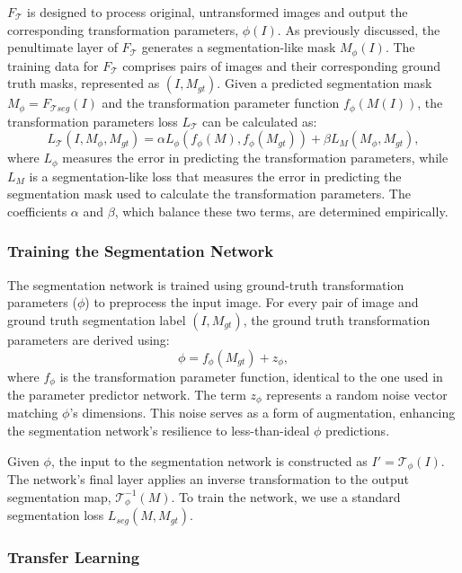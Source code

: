 \(F_{\mathcal{T}}\) is designed to process original, untransformed images and output the corresponding transformation parameters, \( \phi(I) \). As previously discussed, the penultimate layer of \(F_{\mathcal{T}}\) generates a segmentation-like mask \( M_\phi(I) \). The training data for \(F_{\mathcal{T}}\) comprises pairs of images and their corresponding ground truth masks, represented as \((I, M_{gt})\). Given a predicted segmentation mask $M_\phi = F_{\mathcal{T}seg}(I)$ and the transformation parameter function $f_\phi(M(I))$, the transformation parameters loss $L_\mathcal{T}$ can be calculated as:
\begin{equation}
	L_\mathcal{T}(I, M_\phi, M_{gt}) = \alpha L_\phi(f_\phi(M), f_\phi(M_{gt})) + \beta L_{M}(M_\phi, M_{gt}),
\end{equation}
where $L_\phi$ measures the error in predicting the transformation parameters, while $L_{M}$ is a segmentation-like loss that measures the error in predicting the segmentation mask used to calculate the transformation parameters. The coefficients \(\alpha\) and \(\beta\), which balance these two terms, are determined empirically.

\subsubsection{Training the Segmentation Network}

The segmentation network is trained using ground-truth transformation parameters (\(\phi\)) to preprocess the input image. For every pair of image and ground truth segmentation label \((I, M_{gt})\), the ground truth transformation parameters are derived using:
\begin{equation}
	\phi = f_\phi(M_{gt}) + z_\phi,
\end{equation}
where \(f_\phi\) is the transformation parameter function, identical to the one used in the parameter predictor network. The term \(z_\phi\) represents a random noise vector matching \(\phi\)'s dimensions. This noise serves as a form of augmentation, enhancing the segmentation network's resilience to less-than-ideal \(\phi\) predictions.

Given $\phi$, the input to the segmentation network is constructed as $I' = \mathcal{T}_\phi(I)$. The network's final layer applies an inverse transformation to the output segmentation map, \(\mathcal{T}^{-1}_\phi(M)\). To train the network, we use a standard segmentation loss $L_{seg}(M, M_{gt})$.

\subsubsection{Transfer Learning}

